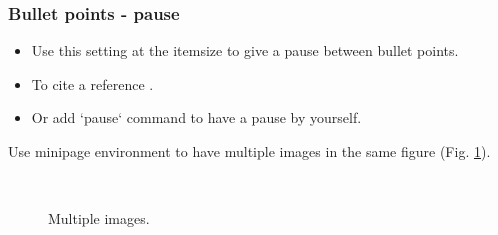 \documentclass[t, aspectratio=169]{beamer}
\begin{document}
\begin{frame}
\frametitle{Bullet points - pause}
\begin{itemize} [<+->]
    \item Use this setting at the itemsize to give a pause between bullet points.
    \item To cite a reference \cite{book_key}. 
    \item Or add `pause` command to have a pause by yourself.
\end{itemize}

\pause

Use minipage environment to have multiple images in the same figure (Fig. \ref{fig:multiple}).

\begin{figure}
\begin{minipage}{.7\textwidth}
\centering
{}~%
~

\caption{Multiple images.}
\label{fig:multiple} 
\end{minipage}%

\end{figure}

\vspace{-1.8em}

\end{frame}
\end{document}
